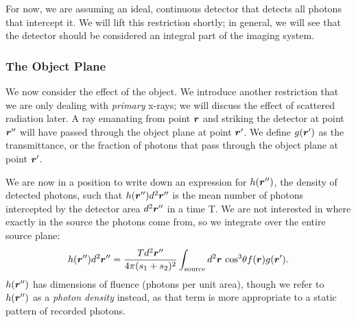 \documentclass[mphy386-notes.tex]{subfiles}
\begin{document}
For now, we are assuming an ideal, continuous detector that detects all photons
that intercept it. We will lift this restriction shortly; in general, we will
see that the detector should be considered an integral part of the imaging
system.

\subsubsection{The Object Plane}

We now consider the effect of the object. We introduce another restriction
that we are only dealing with \textit{primary} x-rays; we will discuss the
effect of scattered radiation later. A ray emanating from point $\boldsymbol{r}$ and
striking the detector at point $\boldsymbol{r}''$ will have passed through the object
plane at point $\boldsymbol{r}'$. We define $g(\boldsymbol{r}')$ as the transmittance, or the
fraction of photons that pass through the object plane at point $\boldsymbol{r}'$.

We are now in a position to write down an expression for $h(\boldsymbol{r}'')$, the
density of detected photons, such that $h(\boldsymbol{r}'')d^2\boldsymbol{r}''$ is the mean
number of photons intercepted by the detector area $d^2\boldsymbol{r}''$ in a time T.
We are not interested in where exactly in the source the photons come from,
so we integrate over the entire source plane:
\begin{align}
  h(\boldsymbol{r}'')d^2\boldsymbol{r}'' = \frac{Td^2\boldsymbol{r}''}{4\pi(s_1 + s_2)^2}\int_{\text{source}}d^2\boldsymbol{r} \text{ cos}^3\theta f(\boldsymbol{r})g(\boldsymbol{r}').
  \label{eq:h1}
\end{align}
$h(\boldsymbol{r}'')$ has dimensions of fluence (photons per unit area), though
we refer to $h(\boldsymbol{r}'')$ as a \textit{photon density} instead, as that
term is more appropriate to a static pattern of recorded photons.
\end{document}
